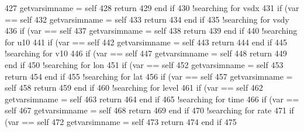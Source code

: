 \begin{DoxyCode}
427         getvarsimname = self%
428         \textcolor{keywordflow}{return}
429 \textcolor{keywordflow}{    end if}
430     \textcolor{comment}{!searching for vsdx}
431     \textcolor{keywordflow}{if} (var == self%
432         getvarsimname = self%
433         \textcolor{keywordflow}{return}
434 \textcolor{keywordflow}{    end if}
435     \textcolor{comment}{!searching for vsdy}
436     \textcolor{keywordflow}{if} (var == self%
437         getvarsimname = self%
438         \textcolor{keywordflow}{return}
439 \textcolor{keywordflow}{    end if}
440     \textcolor{comment}{!searching for u10}
441     \textcolor{keywordflow}{if} (var == self%
442         getvarsimname = self%
443         \textcolor{keywordflow}{return}
444 \textcolor{keywordflow}{    end if}
445     \textcolor{comment}{!searching for v10}
446     \textcolor{keywordflow}{if} (var == self%
447         getvarsimname = self%
448         \textcolor{keywordflow}{return}
449 \textcolor{keywordflow}{    end if}
450     \textcolor{comment}{!searching for lon}
451     \textcolor{keywordflow}{if} (var == self%
452         getvarsimname = self%
453         \textcolor{keywordflow}{return}
454 \textcolor{keywordflow}{    end if}
455     \textcolor{comment}{!searching for lat}
456     \textcolor{keywordflow}{if} (var == self%
457         getvarsimname = self%
458         \textcolor{keywordflow}{return}
459 \textcolor{keywordflow}{    end if}
460     \textcolor{comment}{!searching for level}
461     \textcolor{keywordflow}{if} (var == self%
462         getvarsimname = self%
463         \textcolor{keywordflow}{return}
464 \textcolor{keywordflow}{    end if}
465     \textcolor{comment}{!searching for time}
466     \textcolor{keywordflow}{if} (var == self%
467         getvarsimname = self%
468         \textcolor{keywordflow}{return}
469 \textcolor{keywordflow}{    end if}
470     \textcolor{comment}{!searching for rate}
471     \textcolor{keywordflow}{if} (var == self%
472         getvarsimname = self%
473         \textcolor{keywordflow}{return}
474 \textcolor{keywordflow}{    end if}
475 
\end{DoxyCode}
\mbox{\label{namespacesimulationglobals__mod_ad983ee8885b275c6fa1369f1e158e078}} 
